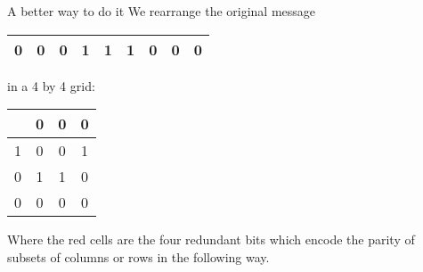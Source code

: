 \begin{frame}{A better way to do it}
We rearrange the original message
\begin{tabular}{|c|c|c|c|c|c|c|c|c|}
    \hline
    \rowcolor{blue!20} 0 & 0 & 0 & 1 &  1 & 1 & 0 & 0 & 0 \\
    \hline
\end{tabular}
in a 4 by 4 grid: \\
\begin{center}

\begin{tabular}{|c|c|c|c|}
\hline
     &  \cellcolor{red!20} 0 & \cellcolor{red!20} 0 & \cellcolor{blue!20}  0  \\ \hline
    \cellcolor{red!20} 1 & \cellcolor{blue!20} 0 & \cellcolor{blue!20}  0 & \cellcolor{blue!20} 1  \\ \hline
    \cellcolor{red!20} 0 & \cellcolor{blue!20} 1 &\cellcolor{blue!20}  1 &\cellcolor{blue!20} 0  \\ \hline
    \rowcolor{blue!20}0 & 0 & 0 & 0  \\ \hline
\end{tabular}
\end{center}
Where the red cells are the four redundant bits which encode the parity of subsets of columns or rows in the following way. \\


\end{frame}
